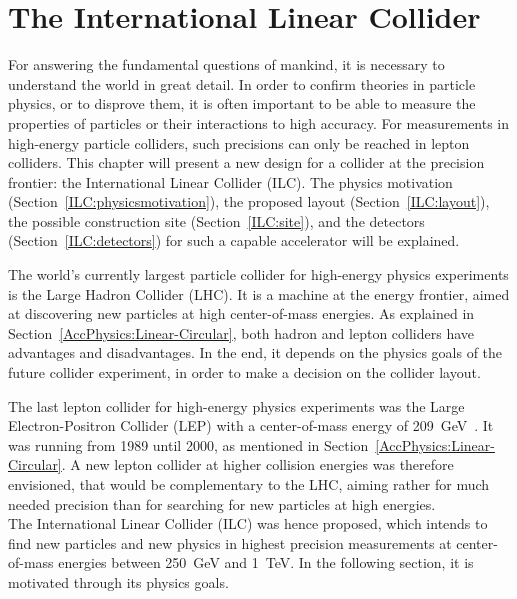 \chapter{The International Linear Collider}
\label{ILC}
\begin{chapterabstract}
For answering the fundamental questions of mankind, it is necessary to understand the world in great detail.
In order to confirm theories in particle physics, or to disprove them, it is often important to be able to measure the properties of particles or their interactions to high accuracy.
For measurements in high-energy particle colliders, such precisions can only be reached in lepton colliders.
This chapter will present a new design for a collider at the precision frontier: the International Linear Collider (ILC). 
The physics motivation (Section~\ref{ILC:physicsmotivation}), the proposed layout (Section~\ref{ILC:layout}), the possible construction site (Section~\ref{ILC:site}), and the detectors (Section~\ref{ILC:detectors}) for such a capable accelerator will be explained.
\end{chapterabstract}
\vspace*{0.5cm}\newline
\noindent
The world's currently largest particle collider for high-energy physics experiments is the Large Hadron Collider (LHC).
It is a machine at the energy frontier, aimed at discovering new particles at high center-of-mass energies.
As explained in Section~\ref{AccPhysics:Linear-Circular}, both hadron and lepton colliders have advantages and disadvantages.
In the end, it depends on the physics goals of the future collider experiment, in order to make a decision on the collider layout.

The last lepton collider for high-energy physics experiments was the Large Electron-Positron Collider (LEP) with a center-of-mass energy of \SI{209}{\GeV}~\cite{LEP}.
It was running from 1989 until 2000, as mentioned in Section~\ref{AccPhysics:Linear-Circular}. 
A new lepton collider at higher collision energies was therefore envisioned, that would be complementary to the LHC, aiming rather for much needed precision than for searching for new particles at high energies.
\\The International Linear Collider (ILC) was hence proposed, which intends to find new particles and new physics in highest precision measurements at center-of-mass energies between \SI{250}{\GeV} and \SI{1}{\TeV}.
In the following section, it is motivated through its physics goals.


